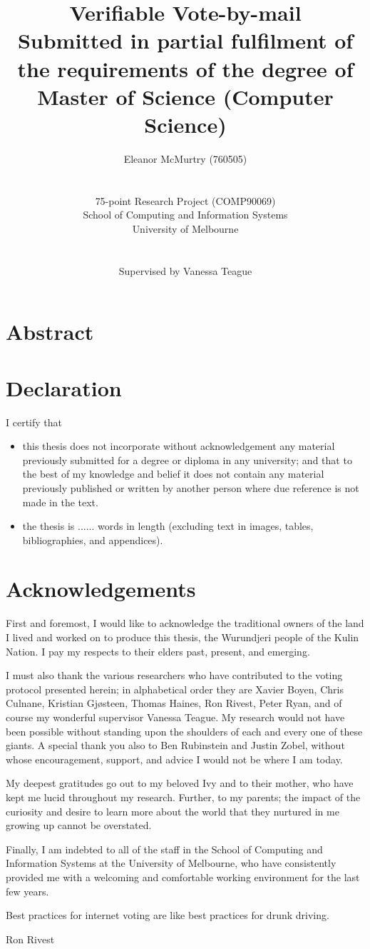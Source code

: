 \documentclass[12pt,a4paper]{article}
\title{Verifiable Vote-by-mail\\\large Submitted in partial fulfilment of the requirements of the degree of\\Master of Science (Computer Science)}
\author{Eleanor McMurtry (760505)\\\\\\75-point Research Project (COMP90069)\\School of Computing and Information Systems\\University of Melbourne\\\\\\Supervised by Vanessa Teague}
\theoremstyle{definition}
\begin{document}
\maketitle
\newpage
\tableofcontents
\newpage
\section*{Abstract}
\section*{Declaration}
I certify that
\begin{itemize}
    \item this thesis does not incorporate without acknowledgement any material previously submitted for a degree or diploma in any university; and that to the best of my knowledge and belief it does not contain any material previously published or written by another person where due reference is not made in the text.
    \item the thesis is ...... words in length (excluding text in images, tables, bibliographies, and appendices).
\end{itemize}
\newpage
\section*{Acknowledgements}
First and foremost, I would like to acknowledge the traditional owners of the land I lived and worked on to produce this thesis, the Wurundjeri people of the Kulin Nation. I pay my respects to their elders past, present, and emerging.

I must also thank the various researchers who have contributed to the voting protocol presented herein; in alphabetical order they are Xavier Boyen, Chris Culnane, Kristian Gjøsteen, Thomas Haines, Ron Rivest, Peter Ryan, and of course my wonderful supervisor Vanessa Teague. My research would not have been possible without standing upon the shoulders of each and every one of these giants. A special thank you also to Ben Rubinstein and Justin Zobel, without whose encouragement, support, and advice I would not be where I am today.

My deepest gratitudes go out to my beloved Ivy and to their mother, who have kept me lucid throughout my research. Further, to my parents; the impact of the curiosity and desire to learn more about the world that they nurtured in me growing up cannot be overstated.

Finally, I am indebted to all of the staff in the School of Computing and Information Systems at the University of Melbourne, who have consistently provided me with a welcoming and comfortable working environment for the last few years.
\newpage
\epigraph{Best practices for internet voting are like best practices for drunk driving.}{Ron Rivest}
\end{document}
